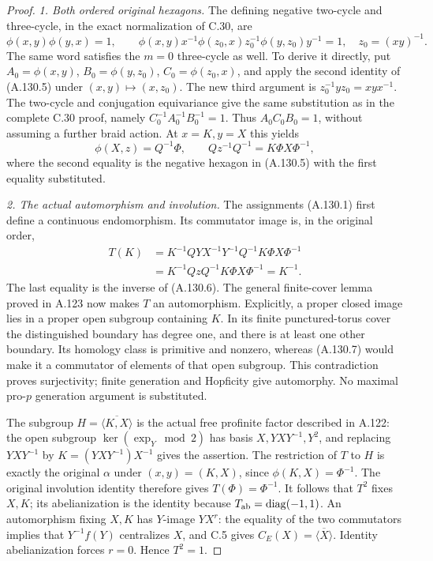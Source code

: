 \begin{proof}
\emph{1. Both ordered original hexagons.}
The defining negative two-cycle and three-cycle, in the exact
normalization of C.30, are
\[
 \phi(x,y)\phi(y,x)=1,\qquad
 \phi(x,y)x^{-1}\phi(z_0,x)z_0^{-1}\phi(y,z_0)y^{-1}=1,
 \quad z_0=(xy)^{-1}.                                      \tag{A.130.5}
\]
The same word satisfies the \(m=0\) three-cycle as well.
To derive it directly, put
\(A_0=\phi(x,y)\), \(B_0=\phi(y,z_0)\),
\(C_0=\phi(z_0,x)\), and apply the second identity of
(A.130.5) under \((x,y)\mapsto(x,z_0)\).
The new third argument is \(z_0^{-1}yz_0=xyx^{-1}\).
The two-cycle and conjugation equivariance give the same
substitution as in the complete C.30 proof, namely
\(C_0^{-1}A_0^{-1}B_0^{-1}=1\).
Thus \(A_0C_0B_0=1\), without assuming a further braid action.
At \(x=K,y=X\) this yields
\[
 \phi(X,z)=Q^{-1}\Phi,\qquad
                Qz^{-1}Q^{-1}=K\Phi X\Phi^{-1},              \tag{A.130.6}
\]
where the second equality is the negative hexagon in
(A.130.5) with the first equality substituted.

\emph{2. The actual automorphism and involution.}
The assignments (A.130.1) first define a continuous endomorphism.
Its commutator image is, in the original order,
\[
 \begin{aligned}
 T(K)&=K^{-1}QYX^{-1}Y^{-1}Q^{-1}K\Phi X\Phi^{-1}\\
     &=K^{-1}QzQ^{-1}K\Phi X\Phi^{-1}=K^{-1}.
 \end{aligned}                                              \tag{A.130.7}
\]
The last equality is the inverse of (A.130.6).
The general finite-cover lemma proved in A.123 now makes \(T\)
an automorphism. Explicitly, a proper closed image lies in a
proper open subgroup containing \(K\). In its finite
punctured-torus cover the distinguished boundary has degree one,
and there is at least one other boundary. Its homology class is
primitive and nonzero, whereas (A.130.7) would make it a
commutator of elements of that open subgroup. This contradiction
proves surjectivity; finite generation and Hopficity give
automorphy. No maximal pro-\(p\) generation argument is substituted.

The subgroup \(H=\overline{\langle K,X\rangle}\) is the actual
free profinite factor described in A.122: the open subgroup
\(\ker(\exp_Y\bmod2)\) has basis
\(X,YXY^{-1},Y^2\), and replacing \(YXY^{-1}\) by
\(K=(YXY^{-1})X^{-1}\) gives the assertion. The restriction
of \(T\) to \(H\) is exactly the original \(\alpha\) under
\((x,y)=(K,X)\), since \(\phi(K,X)=\Phi^{-1}\).
The original involution identity therefore gives
\(T(\Phi)=\Phi^{-1}\).
It follows that \(T^2\) fixes \(X,K\); its abelianization is
the identity because \(T_{\rm ab}=\operatorname{diag}(-1,1)\).
An automorphism fixing \(X,K\) has \(Y\)-image \(YX^r\):
the equality of the two commutators implies that
\(Y^{-1}f(Y)\) centralizes \(X\), and C.5 gives
\(C_E(X)=\overline{\langle X\rangle}\).
Identity abelianization forces \(r=0\). Hence \(T^2=1\).


\end{proof}
